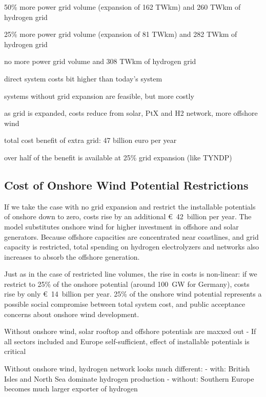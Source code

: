 50\% more power grid volume (expansion of 162 TWkm) and 260 TWkm of hydrogen grid

25\% more power grid volume (expansion of 81 TWkm) and 282 TWkm of hydrogen grid

no more power grid volume and 308 TWkm of hydrogen grid

direct system costs bit higher than today's system

systems without grid expansion are feasible, but more costly

as grid is expanded, costs reduce from solar, PtX and H2 network, more offshore wind

total cost benefit of extra grid: 47 billion euro per year

over half of the benefit is available at 25\% grid expansion (like TYNDP)







\subsection{Cost of Onshore Wind Potential Restrictions}
\label{sec:si:onw}

If we take the case with no grid expansion and restrict the installable
potentials of onshore down to zero, costs rise by an additional \euro~42~billion
per year. The model substitutes onshore wind for
higher investment in offshore and solar generators. Because offshore capacities
are concentrated near coastlines, and grid capacity is restricted, total
spending on hydrogen electrolyzers and networks also increases to absorb the
offshore generation.

Just as in the case of restricted line volumes, the rise in costs is non-linear:
if we restrict to 25\% of the onshore potential (around 100~GW for Germany),
costs rise by only \euro~14~billion per year. 25\% of the onshore wind potential
represents a possible social compromise between total system cost, and public
acceptance concerns about onshore wind development.

Without onshore wind, solar rooftop and offshore potentials are maxxed out
- If all sectors included and Europe self-sufficient, effect of installable potentials is critical

Without onshore wind, hydrogen network looks much different:
- with: British Isles and North Sea dominate hydrogen production
- without: Southern Europe becomes much larger exporter of hydrogen

